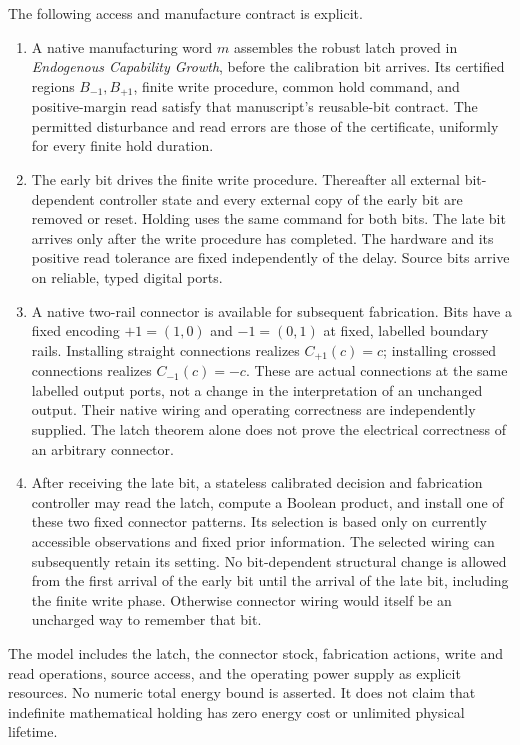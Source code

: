 \documentclass[11pt]{article}
\theoremstyle{definition}
\theoremstyle{remark}
\begin{document}
The following access and manufacture contract is explicit.
\begin{enumerate}
\item A native manufacturing word $m$ assembles the robust latch proved in
\emph{Endogenous Capability Growth}, before the calibration bit arrives.
Its certified regions $B_{-1},B_{+1}$, finite write procedure, common hold
command, and positive-margin read satisfy that manuscript's reusable-bit
contract. The permitted disturbance and read errors are those of the
certificate, uniformly for every finite hold duration.
\item The early bit drives the finite write procedure. Thereafter all
external bit-dependent controller state and every external copy of the
early bit are removed or reset. Holding uses the same command for both
bits. The late bit arrives only after the write procedure has completed.
The hardware and its positive read tolerance are fixed independently of
the delay. Source bits arrive on reliable, typed digital ports.
\item A native two-rail connector is available for subsequent fabrication.
Bits have a fixed encoding $+1=(1,0)$ and $-1=(0,1)$ at fixed, labelled
boundary rails. Installing straight connections realizes $C_{+1}(c)=c$;
installing crossed connections realizes $C_{-1}(c)=-c$. These are actual
connections at the same labelled output ports, not a change in the
interpretation of an unchanged output. Their native wiring and operating
correctness are independently supplied. The latch theorem alone does not
prove the electrical correctness of an arbitrary connector.
\item After receiving the late bit, a stateless calibrated decision and
fabrication controller may read the latch, compute a Boolean product, and
install one of these two fixed connector patterns. Its selection is based
only on currently accessible observations and fixed prior information.
The selected wiring can subsequently retain its setting. No bit-dependent
structural change is allowed from the first arrival of the early bit until
the arrival of the late bit, including the finite write phase. Otherwise
connector wiring would itself be an uncharged way to remember that bit.
\end{enumerate}
The model includes the latch, the connector stock, fabrication actions,
write and read operations, source access, and the operating power supply
as explicit resources. No numeric total energy bound is asserted. It does
not claim that indefinite mathematical holding has zero energy cost or
unlimited physical lifetime.
\end{document}
